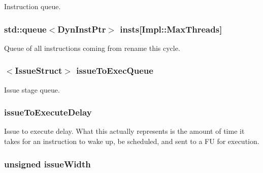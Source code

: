 Instruction queue. \hypertarget{classDefaultIEW_a1b0ce60f9b6c662a2f3df87a3e8b50f8}{
\subsubsection[{insts}]{\setlength{\rightskip}{0pt plus 5cm}std::queue$<${\bf DynInstPtr}$>$ {\bf insts}\mbox{[}Impl::MaxThreads\mbox{]}}}
\label{classDefaultIEW_a1b0ce60f9b6c662a2f3df87a3e8b50f8}
Queue of all instructions coming from rename this cycle. \hypertarget{classDefaultIEW_ae11bca71ca0d33ab0c3b0fafd7bbb758}{
\subsubsection[{issueToExecQueue}]{$<${\bf IssueStruct}$>$ {\bf issueToExecQueue}}}
\label{classDefaultIEW_ae11bca71ca0d33ab0c3b0fafd7bbb758}
Issue stage queue. \hypertarget{classDefaultIEW_a40f102cb54be0bc75cfbd9a70b696091}{
\subsubsection[{issueToExecuteDelay}]{ {\bf issueToExecuteDelay}}}
\label{classDefaultIEW_a40f102cb54be0bc75cfbd9a70b696091}
Issue to execute delay. What this actually represents is the amount of time it takes for an instruction to wake up, be scheduled, and sent to a FU for execution. \hypertarget{classDefaultIEW_a574eb3fb1659bd364f4f613662fa2ead}{
\subsubsection[{issueWidth}]{\setlength{\rightskip}{0pt plus 5cm}unsigned {\bf issueWidth}}}
